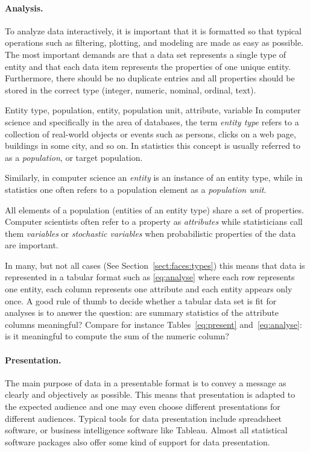 \paragraph{Analysis.} To analyze data interactively, it is important that it is
formatted so that typical operations such as filtering, plotting, and modeling
are made as easy as possible. The most important demands are that a data set
represents a single type of entity and that each data item represents the
properties of one unique entity. Furthermore, there should be no duplicate
entries and all properties should be stored in the correct type (integer,
numeric, nominal, ordinal, text).  
%
\begin{terminology}{Entity type, population, entity, population unit, attribute, variable}
In computer science and specifically in the area of databases, the term \textit{entity
type} refers to a collection of real-world objects or events such as persons, clicks
on a web page, buildings in some city, and so on. In statistics this concept is usually
referred to as a \textit{population}, or target population.

Similarly, in computer science an \textit{entity} is an instance of an entity
type, while in statistics one often refers to a population element as a
\textit{population unit}.

All elements of a population (entities of an entity type) share a set of
properties.  Computer scientists often refer to a property as
\textit{attributes} while statisticians call them \textit{variables} or
\textit{stochastic variables} when probabilistic properties of the data are
important.
\end{terminology}
%
In many, but not all cases (See Section~\ref{sect:faces:types}) this means that
data is represented in a tabular format such as \eqref{eq:analyse} where each
row represents one entity, each column represents one attribute and  each
entity appears only once. A good rule of thumb to decide whether a tabular data
set is fit for analyses is to answer the question: are summary statistics of
the attribute columns meaningful? Compare for instance
Tables~\eqref{eq:present} and~\eqref{eq:analyse}: is it meaningful to compute
the sum of the numeric column? 

\paragraph{Presentation.} The main purpose of data in a presentable format is
to convey a message as clearly and objectively as possible. This means that
presentation is adapted to the expected audience and one may even choose
different presentations for different audiences. Typical tools for data
presentation include spreadsheet software, or business intelligence software
like Tableau. Almost all statistical software packages also offer some kind of
support for data presentation.


